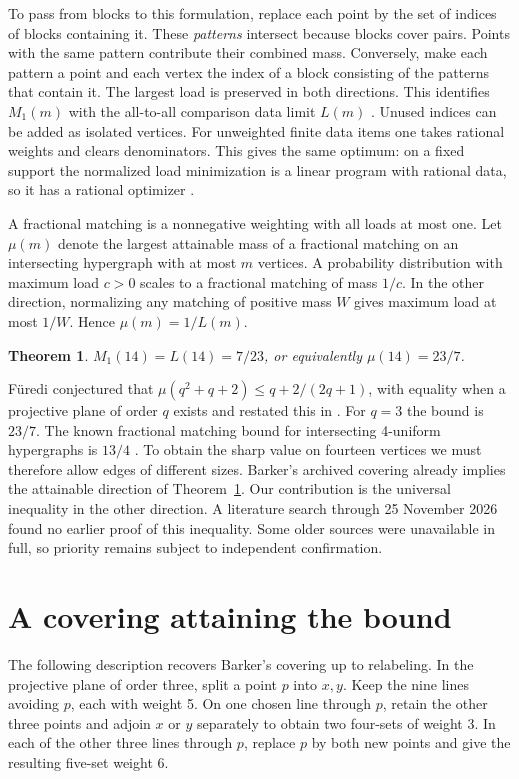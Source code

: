 \documentclass[11pt]{article}
\newtheorem{theorem}{Theorem}
\begin{document}
To pass from blocks to this formulation, replace each point by the set
of indices of blocks containing it. These \emph{patterns} intersect
because blocks cover pairs. Points with the same pattern contribute their
combined mass. Conversely, make each pattern a point and each vertex
the index of a block consisting of the patterns that contain it.
The largest load is preserved in both directions. This identifies
\(M_1(m)\) with the all-to-all comparison data limit \(L(m)\)
\cite[Lemma~3.1]{hhs}. Unused indices can be added as isolated vertices.
For unweighted finite data items one takes rational weights and clears
denominators. This gives the same optimum: on a fixed support the
normalized load minimization is a linear program with rational data,
so it has a rational optimizer \cite[Lemmas~3.1 and 3.4]{hhs}.

A fractional matching is a nonnegative weighting with all loads at
most one. Let \(\mu(m)\) denote the largest attainable mass of a
fractional matching on an intersecting hypergraph with at most \(m\)
vertices. A probability distribution with maximum load \(c>0\) scales
to a fractional matching of mass \(1/c\). In the other direction,
normalizing any matching of positive mass \(W\) gives maximum load at
most \(1/W\). Hence \(\mu(m)=1/L(m)\).

\begin{theorem}\label{thm:main}
\(M_1(14)=L(14)=7/23\), or equivalently \(\mu(14)=23/7\).
\end{theorem}

F\"uredi conjectured that \(\mu(q^2+q+2)\le q+2/(2q+1)\), with equality
when a projective plane of order \(q\) exists
\cite[Conjecture (6.3)]{furedi90} and restated this in
\cite[Conjecture 4.9]{furedi94}.
For \(q=3\) the bound is \(23/7\). The known fractional matching bound
for intersecting 4-uniform hypergraphs is \(13/4\) \cite{furedi}.
To obtain the sharp value on fourteen vertices we must therefore allow
edges of different sizes. Barker's archived covering \cite{barker}
already implies the attainable direction of Theorem~\ref{thm:main}.
Our contribution is the universal inequality in the other direction.
A literature search through 25 November 2026 found no earlier proof
of this inequality. Some older sources were unavailable in full, so
priority remains subject to independent confirmation.

\section{A covering attaining the bound}
The following description recovers Barker's covering up to relabeling.
In the projective plane of order three, split a point \(p\) into \(x,y\).
Keep the nine lines avoiding \(p\), each with weight 5. On one chosen
line through \(p\), retain the other three points and adjoin \(x\) or
\(y\) separately to obtain two four-sets of weight 3. In each of the
other three lines through \(p\), replace \(p\) by both new points and
give the resulting five-set weight 6.
\end{document}
